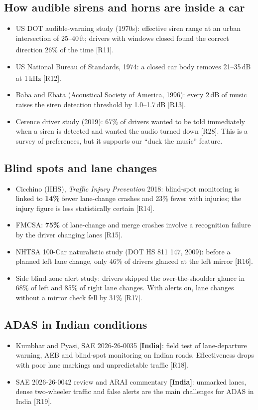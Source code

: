 \documentclass[11pt]{article}
\newcommand{\IN}{{\color{sky}\bfseries[India]}}
\newcommand{\chk}{\textsuperscript{\color{alert}\dag}}
\renewcommand{\cite}[1]{{\color{navy}[#1]}}
\begin{document}
\subsection{How audible sirens and horns are inside a car}
\begin{itemize}[leftmargin=*]
  \item US DOT audible-warning study (1970s): effective siren range at an urban intersection of 25--40\,ft; drivers with windows closed found the correct direction 26\% of the time \cite{R11}\chk.
  \item US National Bureau of Standards, 1974: a closed car body removes 21--35\,dB at 1\,kHz \cite{R12}\chk.
  \item Baba and Ebata (Acoustical Society of America, 1996): every 2\,dB of music raises the siren detection threshold by 1.0--1.7\,dB \cite{R13}.
  \item Cerence driver study (2019): 67\% of drivers wanted to be told immediately when a siren is detected and wanted the audio turned down \cite{R28}. This is a survey of preferences, but it supports our ``duck the music'' feature.
\end{itemize}

\subsection{Blind spots and lane changes}
\begin{itemize}[leftmargin=*]
  \item Cicchino (IIHS), \emph{Traffic Injury Prevention} 2018: blind-spot monitoring is linked to \textbf{14\%} fewer lane-change crashes and 23\% fewer with injuries; the injury figure is less statistically certain \cite{R14}.
  \item FMCSA: \textbf{75\%} of lane-change and merge crashes involve a recognition failure by the driver changing lanes \cite{R15}.
  \item NHTSA 100-Car naturalistic study (DOT HS 811 147, 2009): before a planned left lane change, only 46\% of drivers glanced at the left mirror \cite{R16}.
  \item Side blind-zone alert study: drivers skipped the over-the-shoulder glance in 68\% of left and 85\% of right lane changes. With alerts on, lane changes without a mirror check fell by 31\% \cite{R17}.
\end{itemize}

\subsection{ADAS in Indian conditions}
\begin{itemize}[leftmargin=*]
  \item Kumbhar and Pyasi, SAE 2026-26-0035 \IN: field test of lane-departure warning, AEB and blind-spot monitoring on Indian roads. Effectiveness drops with poor lane markings and unpredictable traffic \cite{R18}.
  \item SAE 2026-26-0042 review and ARAI commentary \IN: unmarked lanes, dense two-wheeler traffic and false alerts are the main challenges for ADAS in India \cite{R19}.
\end{itemize}
\end{document}
